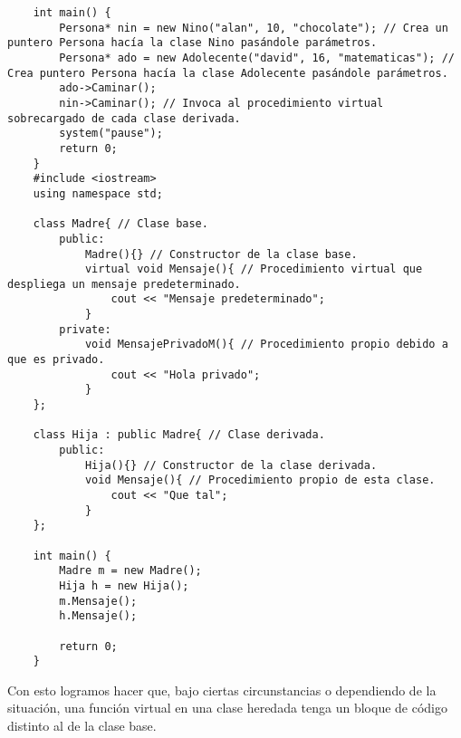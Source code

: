 \begin{lstlisting}
    int main() {
        Persona* nin = new Nino("alan", 10, "chocolate"); // Crea un puntero Persona hacía la clase Nino pasándole parámetros.
        Persona* ado = new Adolecente("david", 16, "matematicas"); // Crea puntero Persona hacía la clase Adolecente pasándole parámetros.
        ado->Caminar();
        nin->Caminar(); // Invoca al procedimiento virtual sobrecargado de cada clase derivada.
        system("pause");
        return 0;
    }
    #include <iostream>
    using namespace std;
    
    class Madre{ // Clase base.
        public:
            Madre(){} // Constructor de la clase base.
            virtual void Mensaje(){ // Procedimiento virtual que despliega un mensaje predeterminado.
                cout << "Mensaje predeterminado";
            }
        private:
            void MensajePrivadoM(){ // Procedimiento propio debido a que es privado.
                cout << "Hola privado";
            }
    };
    
    class Hija : public Madre{ // Clase derivada.
        public:
            Hija(){} // Constructor de la clase derivada.
            void Mensaje(){ // Procedimiento propio de esta clase.
                cout << "Que tal";
            }
    };
    
    int main() {
        Madre m = new Madre();
        Hija h = new Hija();
        m.Mensaje();
        h.Mensaje();
        
        return 0;
    }
\end{lstlisting}

Con esto logramos hacer que, bajo ciertas circunstancias o dependiendo de la situación, una función virtual en una clase heredada tenga un bloque de código distinto al de la clase base.

